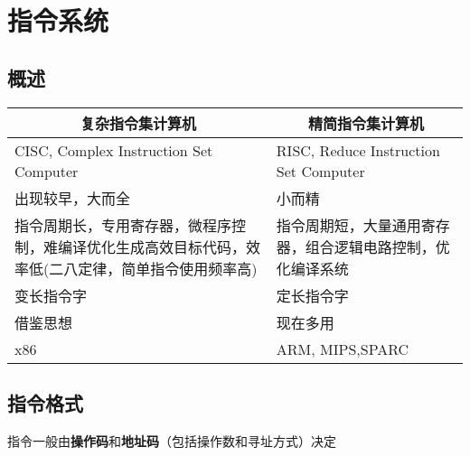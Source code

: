 
\section{指令系统}
\subsection{概述}
\begin{center}
\begin{tabular}{|m{8cm}|m{8cm}|}
\hline
\multicolumn{1}{|c|}{复杂指令集计算机} & \multicolumn{1}{c|}{精简指令集计算机} \\\hline
CISC, Complex Instruction Set Computer & RISC, Reduce Instruction Set Computer\\\hline
出现较早，大而全 & 小而精 \\\hline
指令周期长，专用寄存器，微程序控制，难编译优化生成高效目标代码，效率低(二八定律，简单指令使用频率高) & 指令周期短，大量通用寄存器，组合逻辑电路控制，优化编译系统\\\hline
变长指令字 & 定长指令字 \\\hline
借鉴思想 & 现在多用 \\\hline
x86 & ARM, MIPS,SPARC \\\hline
\end{tabular}
\end{center}

\subsection{指令格式}
指令一般由\textbf{操作码}和\textbf{地址码}（包括操作数和寻址方式）决定


